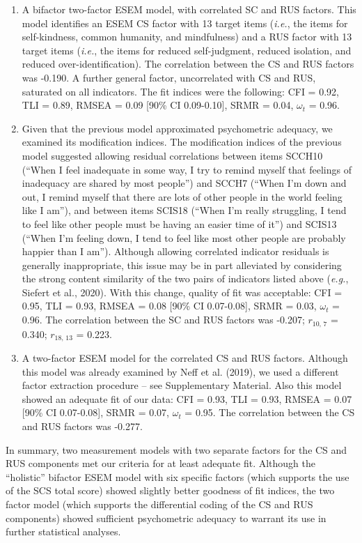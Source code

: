\documentclass[
  english,
  man,floatsintext]{apa7}
\begin{document}
\begin{enumerate}
\def\labelenumi{\arabic{enumi}.}
\item
  A bifactor two-factor ESEM model, with correlated SC and RUS factors. This model identifies an ESEM CS factor with 13 target items (\emph{i.e.}, the items for self-kindness, common humanity, and mindfulness) and a RUS factor with 13 target items (\emph{i.e.}, the items for reduced self-judgment, reduced isolation, and reduced over-identification). The correlation between the CS and RUS factors was -0.190. A further general factor, uncorrelated with CS and RUS, saturated on all indicators. The fit indices were the following: CFI = 0.92, TLI = 0.89, RMSEA = 0.09 {[}90\% CI 0.09-0.10{]}, SRMR = 0.04, \(\omega_t\) = 0.96.
\item
  Given that the previous model approximated psychometric adequacy, we examined its modification indices. The modification indices of the previous model suggested allowing residual correlations between items SCCH10 (``When I feel inadequate in some way, I try to remind myself that feelings of inadequacy are shared by most people'') and SCCH7 (``When I'm down and out, I remind myself that there are lots of other people in the world feeling like I am''), and between items SCIS18 (``When I'm really struggling, I tend to feel like other people must be having an easier time of it'') and SCIS13 (``When I'm feeling down, I tend to feel like most other people are probably happier than I am'').
  Although allowing correlated indicator residuals is generally inappropriate, this issue may be in part alleviated by considering the strong content similarity of the two pairs of indicators listed above (\emph{e.g.}, Siefert et al., 2020).
  With this change, quality of fit was acceptable: CFI = 0.95, TLI = 0.93, RMSEA = 0.08 {[}90\% CI 0.07-0.08{]}, SRMR = 0.03, \(\omega_t\) = 0.96.
  The correlation between the SC and RUS factors was -0.207; \(r_{\text{10, 7}}\) = 0.340; \(r_{\text{18, 13}}\) = 0.223.
\item
  A two-factor ESEM model for the correlated CS and RUS factors. Although this model was already examined by Neff et al. (2019), we used a different factor extraction procedure -- see Supplementary Material.
  Also this model showed an adequate fit of our data: CFI = 0.93, TLI = 0.93, RMSEA = 0.07 {[}90\% CI 0.07-0.08{]}, SRMR = 0.07, \(\omega_t\) = 0.95.
  The correlation between the CS and RUS factors was -0.277.
\end{enumerate}

In summary, two measurement models with two separate factors for the CS and RUS components met our criteria for at least adequate fit. Although the ``holistic'' bifactor ESEM model with six specific factors (which supports the use of the SCS total score) showed slightly better goodness of fit indices, the two factor model (which supports the differential coding of the CS and RUS components) showed sufficient psychometric adequacy to warrant its use in further statistical analyses.
\end{document}
